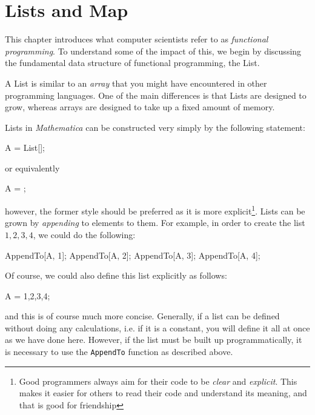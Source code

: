 \chapter{Lists and Map}
\label{chap:ListsMap}
This chapter introduces what computer scientists refer to as \emph{functional programming}. To understand some of the impact of this, we begin by discussing the fundamental data structure of functional programming, the List.

A List is similar to an \emph{array} that you might have encountered in other programming languages. One of the main differences is that Lists are designed to grow, whereas arrays are designed to take up a fixed amount of memory.

Lists in \emph{Mathematica} can be constructed very simply by the following statement:
\begin{code}
	   A = List[];
\end{code}
or equivalently
\begin{code}
	   A = {};
\end{code}
however, the former style should be preferred as it is more explicit\footnote{Good programmers always aim for their code to be \emph{clear} and \emph{explicit}. This makes it easier for others to read their code and understand its meaning, and that is good for friendship}. Lists can be grown by \emph{appending} to elements to them. For example, in order to create the list $1,2,3,4$, we could do the following:
\begin{code}
	   AppendTo[A, 1];
	   AppendTo[A, 2];
	   AppendTo[A, 3];
	   AppendTo[A, 4];
\end{code}

Of course, we could also define this list explicitly as follows:
\begin{code}
	   A = {1,2,3,4};
\end{code}
and this is of course much more concise. Generally, if a list can be defined without doing any calculations, i.e. if it is a constant, you will define it all at once as we have done here. However, if the list must be built up programmatically, it is necessary to use the \texttt{AppendTo} function as described above.
